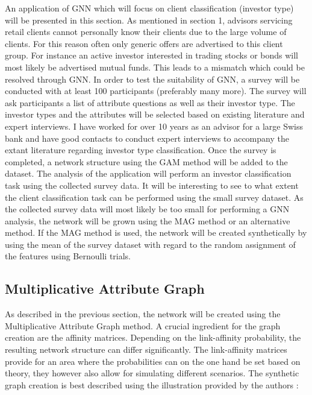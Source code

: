 \documentclass[12pt,a4paper]{article}
\begin{document}
	An application of GNN which will focus on client classification (investor type) will be presented in this section. As mentioned in section 1, 
	advisors servicing retail clients cannot personally know their clients due to the large volume of clients. For this reason often only generic 
	offers are advertised to this client group. For instance an active investor interested in trading stocks or bonds will most likely be advertised 
	mutual funds. This leads to a mismatch which could be resolved through GNN. In order to test the suitability of GNN, a survey will be conducted 
	with at least 100 participants (preferably many more). The survey will ask participants a list of attribute questions as well as their investor 
	type. The investor types and the attributes will be selected based on existing literature and expert interviews. I have worked for over 10 years 
	as an advisor for a large Swiss bank and have good contacts to conduct expert interviews to accompany the extant literature regarding investor 
	type classification. Once the survey is completed, a network structure using the GAM method will be added to the dataset. The analysis of the 
	application will perform an investor classification task using the collected survey data. It will be interesting to see to what extent the client
	classification task can be performed using the small survey dataset. As the collected survey data will most likely be too small for performing
	a GNN analysis, the network will be grown using the MAG method or an alternative method. If the MAG method is used, the network will be created
	synthetically by using the mean of the survey dataset with regard to the random assignment of the features using Bernoulli trials. 
	
	\subsection{Multiplicative Attribute Graph}

	As described in the previous section, the network will be created using the Multiplicative Attribute Graph method. A crucial ingredient for the 
	graph creation are the affinity matrices. Depending on the link-affinity probability, the resulting network structure can differ significantly. The
	link-affinity matrices provide for an area where the probabilities can on the one hand be set based on theory, they however also allow for 
	simulating different scenarios. The synthetic graph creation is best described using the illustration provided by the authors 
	\citep{kim2012multiplicative}:
\end{document}
